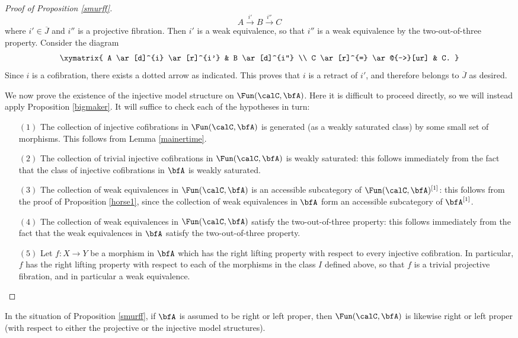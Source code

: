 \begin{Model Categories}
\begin{Didn't Read}
\begin{proof}[Proof of Proposition \ref{smurff}]
$$ A \stackrel{i'}{\rightarrow} B \stackrel{i''}{\rightarrow} C$$
where $i' \in \overline{J}$ and $i''$ is a projective fibration. Then $i'$ is a weak equivalence, so
that $i''$ is a weak equivalence by the two-out-of-three property. Consider the diagram
$$ \xymatrix{ A \ar[d]^{i} \ar[r]^{i'} & B \ar[d]^{i''} \\
C \ar[r]^{=} \ar@{-->}[ur] & C. }$$
Since $i$ is a cofibration, there exists a dotted arrow as indicated. This proves that $i$ is a retract of $i'$, and therefore belongs to $\overline{J}$ as desired.

We now prove the existence of the injective model structure on $\Fun(\calC, \bfA)$. Here
it is difficult to proceed directly, so we will instead apply Proposition \ref{bigmaker}. It will suffice to check each of the hypotheses in turn:
\begin{itemize}
\item[$(1)$] The collection of injective cofibrations in $\Fun(\calC, \bfA)$ is generated (as a weakly saturated class) by some small set of morphisms. This follows from Lemma \ref{mainertime}.
\item[$(2)$] The collection of trivial injective cofibrations in $\Fun(\calC, \bfA)$ is weakly saturated: this follows immediately from the fact that the class of injective cofibrations in $\bfA$ is weakly saturated.
\item[$(3)$] The collection of weak equivalences in $\Fun(\calC, \bfA)$ is an accessible subcategory
of $\Fun(\calC, \bfA)^{[1]}$: this follows from the proof of Proposition \ref{horse1}, since the collection of weak equivalences in $\bfA$ form an accessible subcategory of $\bfA^{[1]}$.  

\item[$(4)$] The collection of weak equivalences in $\Fun(\calC, \bfA)$ satisfy the two-out-of-three property: this follows immediately from the fact that the weak equivalences in $\bfA$ satisfy the two-out-of-three property.

\item[$(5)$] Let $f: X \rightarrow Y$ be a morphism in $\bfA$ which has the right lifting property with respect to every injective cofibration. In particular, $f$ has the right lifting property with respect to each of the morphisms in the class $I$ defined above, so that $f$ is a trivial projective fibration, and in particular a weak equivalence.
\end{itemize}
\end{proof}

\begin{remark}\label{postsm}
In the situation of Proposition \ref{smurff}, if $\bfA$ is assumed to be right or left proper, then $\Fun(\calC, \bfA)$ is likewise right or left proper (with respect to either the projective or the injective model structures). 
\end{remark}


\end{Didn't Read}
\end{Model Categories}
